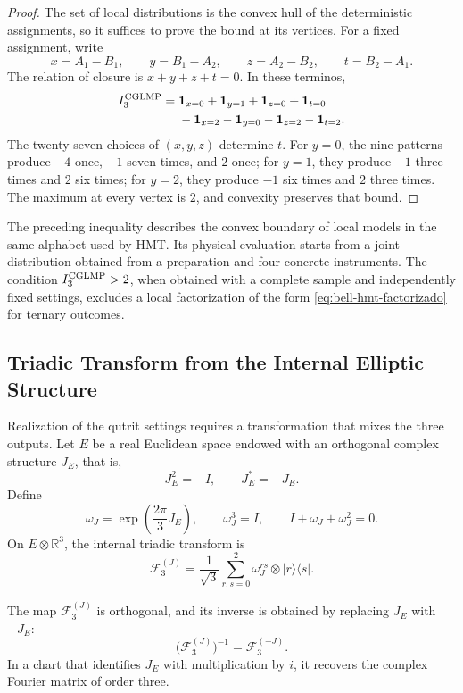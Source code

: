 \begin{proof}
The set of local distributions is the convex hull of the deterministic
assignments, so it suffices to prove the bound at its vertices. For a fixed
assignment, write
\[
 x=A_1-B_1,\qquad y=B_1-A_2,\qquad
 z=A_2-B_2,\qquad t=B_2-A_1.
\]
The relation of closure is \(x+y+z+t=0\). In these terminos,
\[
\begin{aligned}
 I_3^{\rm CGLMP}={}&
 \mathbf1_{x=0}+\mathbf1_{y=1}
 +\mathbf1_{z=0}+\mathbf1_{t=0}\\
 &-\mathbf1_{x=2}-\mathbf1_{y=0}
 -\mathbf1_{z=2}-\mathbf1_{t=2}.
\end{aligned}
\]
The twenty-seven choices of \((x,y,z)\) determine \(t\). For
\(y=0\), the nine patterns produce \(-4\) once, \(-1\) seven times, and
\(2\) once; for \(y=1\), they produce \(-1\) three times and \(2\) six times;
for \(y=2\), they produce \(-1\) six times and \(2\) three times. The maximum at
every vertex is \(2\), and convexity preserves that bound.
\end{proof}

The preceding inequality describes the convex boundary of local models in the
same alphabet used by HMT. Its physical evaluation starts from a joint distribution obtained from a
preparation and four concrete instruments. The condition
\(I_3^{\rm CGLMP}>2\), when obtained with a complete sample and independently fixed
settings, excludes a local factorization of the form
\eqref{eq:bell-hmt-factorizado} for ternary outcomes.

\subsection{Triadic Transform from the Internal Elliptic Structure}

Realization of the qutrit settings requires a transformation that mixes the
three outputs. Let \(E\) be a real Euclidean space endowed with an orthogonal
complex structure \(J_E\), that is,
\[
 J_E^2=-I,
 \qquad
 J_E^{\!*}=-J_E.
\]
Define
\[
 \omega_J=\exp\!\left(\frac{2\pi}{3}J_E\right),
 \qquad
 \omega_J^3=I,
 \qquad
 I+\omega_J+\omega_J^2=0.
\]
On \(E\otimes\mathbb R^3\), the internal triadic transform is
\begin{equation}
 \mathcal F_3^{(J)}
 =\frac1{\sqrt3}\sum_{r,s=0}^{2}
   \omega_J^{rs}\otimes|r\rangle\langle s|.
 \label{eq:fourier-triadica-interna}
\end{equation}

\begin{proposition}
\label{prop:fourier-triadica-unitaria}
The map \(\mathcal F_3^{(J)}\) is orthogonal, and its inverse is obtained
by replacing \(J_E\) with \(-J_E\):
\[
 \bigl(\mathcal F_3^{(J)}\bigr)^{-1}
 =\mathcal F_3^{(-J)}.
\]
In a chart that identifies \(J_E\) with multiplication by \(i\), it recovers the
complex Fourier matrix of order three.
\end{proposition}

